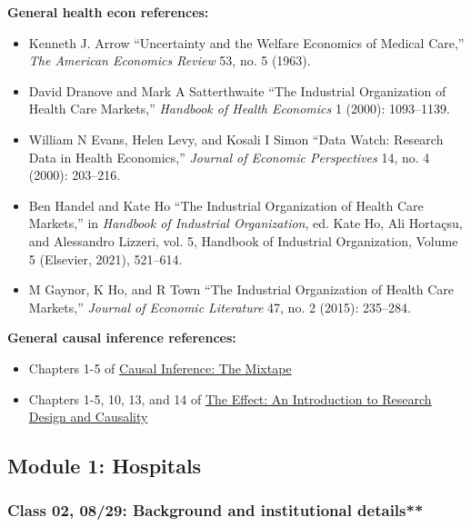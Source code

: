 \documentclass[11pt,]{article}
\providecommand{\tightlist}{%
  \setlength{\itemsep}{0pt}\setlength{\parskip}{0pt}}
\begin{document}
\textbf{General health econ references:}

\begin{itemize}
\tightlist
\item
  Kenneth J. Arrow {``Uncertainty and the {Welfare} {Economics} of
  {Medical} {Care},''} \emph{The American Economics Review} 53, no. 5
  (1963).
\item
  David Dranove and Mark A Satterthwaite {``The Industrial Organization
  of Health Care Markets,''} \emph{Handbook of Health Economics} 1
  (2000): 1093--1139.
\item
  William N Evans, Helen Levy, and Kosali I Simon {``Data Watch:
  {Research} Data in Health Economics,''} \emph{Journal of Economic
  Perspectives} 14, no. 4 (2000): 203--216.
\item
  Ben Handel and Kate Ho {``The Industrial Organization of Health Care
  Markets,''} in \emph{Handbook of {Industrial} {Organization}}, ed.
  Kate Ho, Ali Hortaçsu, and Alessandro Lizzeri, vol. 5, Handbook of
  {Industrial} {Organization}, {Volume} 5 (Elsevier, 2021), 521--614.
\item
  M Gaynor, K Ho, and R Town {``The {Industrial} {Organization} of
  {Health} {Care} {Markets},''} \emph{Journal of Economic Literature}
  47, no. 2 (2015): 235--284.
\end{itemize}

\textbf{General causal inference references:}

\begin{itemize}
\tightlist
\item
  Chapters 1-5 of \href{https://mixtape.scunning.com/}{Causal Inference:
  The Mixtape}
\item
  Chapters 1-5, 10, 13, and 14 of \href{https://theeffectbook.net/}{The
  Effect: An Introduction to Research Design and Causality}
\end{itemize}

\hypertarget{module-1-hospitals}{%
\subsection{Module 1: Hospitals}\label{module-1-hospitals}}

\hypertarget{class-02-0829-background-and-institutional-details}{%
\subsubsection{Class 02, 08/29: Background and institutional
details**}\label{class-02-0829-background-and-institutional-details}}
\end{document}
